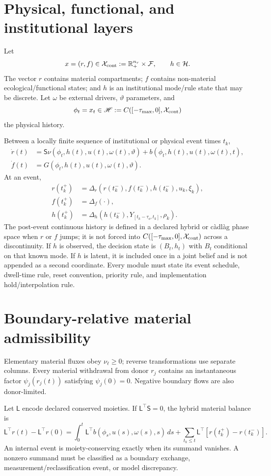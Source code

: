 \documentclass[11pt]{article}
\begin{document}
\section{Physical, functional, and institutional layers}
Let
\[
x=(r,f)\in\mathcal X_{\rm cont}:=\mathbb R_+^{n_r}\times\mathcal F,\qquad h\in\mathcal H.
\]
The vector $r$ contains material compartments; $f$ contains non-material ecological/functional states; and $h$ is an institutional mode/rule state that may be discrete. Let $\omega$ be external drivers, $\vartheta$ parameters, and
\[
\phi_t=x_t\in\mathscr H:=C([-\tau_{\max},0],\mathcal X_{\rm cont})
\]
the physical history.

Between a locally finite sequence of institutional or physical event times $t_k$,
\begin{align}
\dot r(t)&=\mathsf S\nu(\phi_t,h(t),u(t),\omega(t),\vartheta)+b(\phi_t,h(t),u(t),\omega(t),t),\label{eq:flow-r}\\
\dot f(t)&=G(\phi_t,h(t),u(t),\omega(t),\vartheta).\label{eq:flow-f}
\end{align}
At an event,
\begin{align}
r(t_k^+)&=\Delta_r(r(t_k^-),f(t_k^-),h(t_k^-),u_k,\xi_k),\\
f(t_k^+)&=\Delta_f(\cdot),\\
h(t_k^+)&=\Delta_h(h(t_k^-),Y_{[t_k-\tau_o,t_k]},\rho_k).
\end{align}
The post-event continuous history is defined in a declared hybrid or c\`adl\`ag phase space when $r$ or $f$ jumps; it is not forced into $C([-\tau_{\max},0],\mathcal X_{\rm cont})$ across a discontinuity. If $h$ is observed, the decision state is $(B_t,h_t)$ with $B_t$ conditional on that known mode. If $h$ is latent, it is included once in a joint belief and is not appended as a second coordinate.
Every module must state its event schedule, dwell-time rule, reset convention, priority rule, and implementation hold/interpolation rule.

\section{Boundary-relative material admissibility}
Elementary material fluxes obey $\nu_\ell\ge0$; reverse transformations use separate columns. Every material withdrawal from donor $r_j$ contains an instantaneous factor $\psi_j(r_j(t))$ satisfying $\psi_j(0)=0$. Negative boundary flows are also donor-limited.

Let $\mathsf L$ encode declared conserved moieties. If $\mathsf L^\top\mathsf S=0$, the hybrid material balance is
\begin{equation}
\mathsf L^\top r(t)-\mathsf L^\top r(0)
=
\int_0^t\mathsf L^\top b(\phi_s,u(s),\omega(s),s)\,ds
+
\sum_{t_k\le t}\mathsf L^\top[r(t_k^+)-r(t_k^-)].
\label{eq:hybrid-balance}
\end{equation}
An internal event is moiety-conserving exactly when its summand vanishes. A nonzero summand must be classified as a boundary exchange, measurement/reclassification event, or model discrepancy.
\end{document}
